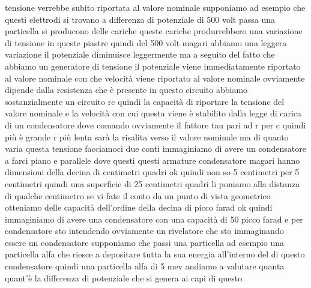 tensione verrebbe subito riportata al valore nominale supponiamo ad esempio che questi elettrodi si trovano a differenza di potenziale di 500 volt passa una particella si producono delle cariche queste cariche produrrebbero una variazione di tensione in queste piastre quindi del 500 volt magari abbiamo una leggera variazione il potenziale diminuisce leggermente ma a seguito del fatto che abbiamo un generatore di tensione il potenziale viene immediatamente riportato al valore nominale con che velocità viene riportato al valore nominale ovviamente dipende dalla resistenza che è presente in questo circuito abbiamo sostanzialmente un circuito rc quindi la capacità di riportare la tensione del valore nominale e la velocità con cui questa viene è stabilito dalla legge di carica di un condensatore dove comando ovviamente il fattore tau pari ad r per c quindi più è grande r più lenta sarà la risalita verso il valore nominale ma di quanto varia questa tensione facciamoci due conti immaginiamo di avere un condensatore a farci piano e parallele dove questi questi armature condensatore magari hanno dimensioni della decina di centimetri quadri ok quindi non so 5 centimetri per 5 centimetri quindi una superficie di 25 centimetri quadri li poniamo alla distanza di qualche centimetro se vi fate il conto da un punto di vista geometrico otteniamo delle capacità dell'ordine della decina di picco farad ok quindi immaginiamo di avere una condensatore con una capacità di 50 picco farad e per condensatore sto intendendo ovviamente un rivelatore che sto immaginando essere un condensatore supponiamo che passi una particella ad esempio una particella alfa che riesce a depositare tutta la sua energia all'interno del di questo condensatore quindi una particella alfa di 5 mev andiamo a valutare quanta quant'è la differenza di potenziale che si genera ai capi di questo 

